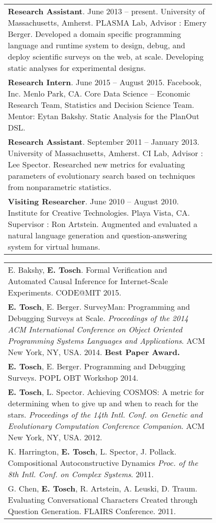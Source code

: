 \documentclass[10pt]{article}
\def \boxwidth {6in}
\newcommand{\cvsec}[2]{
	\begin{figure*}
		\begin{subfigure}[t]{1in}
			\sc{#1} 
		\end{subfigure}
		\begin{subfigure}[t]{6in}
		\vspace{-13px}
		    \begin{longtable}[t]{p{\boxwidth}}
                #2
            \end{longtable}
		\end{subfigure}
	\end{figure*}
}
\begin{document}
\cvsec{Research \newline Experience}{
		{\bf Research Assistant}. June 2013 -- present. University of Massachusetts, Amherst. PLASMA Lab, Advisor : Emery Berger. Developed a domain specific programming language and runtime system
to design, debug, and deploy scientific surveys on the web, at scale. Developing static analyses for experimental designs.\\

{\bf Research Intern}. June 2015 -- August 2015. Facebook, Inc. Menlo Park, CA. Core Data Science -- Economic Research Team, Statistics and Decision Science Team. Mentor: Eytan Bakshy. Static Analysis for the PlanOut DSL. \\

		{\bf Research Assistant}. September 2011 -- January 2013. University of Massachusetts, Amherst. CI Lab, Advisor : Lee Spector. Researched new metrics for evaluating parameters of evolutionary
search based on techniques from nonparametric statistics.\\

		{\bf Visiting Researcher}. June 2010 -- August 2010. Institute for Creative Technologies. Playa Vista, CA. Supervisor : Ron Artstein. Augmented and evaluated a natural language generation and
question-answering system for virtual humans.
}

\cvsec{Publications}{
		E. Bakshy, {\bf E. Tosch}. Formal Verification and Automated Causal Inference for Internet-Scale Experiments. CODE@MIT 2015.\\
		
        {\bf E. Tosch}, E. Berger. SurveyMan: Programming and Debugging Surveys at Scale. \emph{Proceedings of the 2014 ACM International Conference on Object Oriented Programming Systems Languages and Applications}. ACM New York, NY, USA. 2014. {\bf Best Paper Award.}\\
        
        {\bf E. Tosch}, E. Berger. Programming and Debugging Surveys. POPL OBT Workshop 2014.\\
      
		{\bf E. Tosch}, L. Spector. Achieving COSMOS: A metric for determining when to give up and when to reach for the stars. \emph{Proceedings of the 14th Intl. Conf. on Genetic and Evolutionary Computation Conference Companion}. ACM New York, NY, USA. 2012.\\
	K. Harrington, {\bf E. Tosch}, L. Spector, J. Pollack. Compositional Autoconstructive Dynamics \emph{Proc. of the 8th Intl. Conf. on Complex Systems}. 2011.\\
	
	G. Chen, {\bf E. Tosch}, R. Artstein, A. Leuski, D. Traum. Evaluating Conversational Characters Created through Question Generation. FLAIRS Conference. 2011.
}
\end{document}
